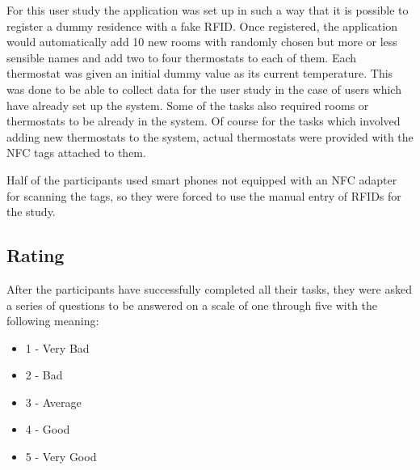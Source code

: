 For this user study the application was set up in such a way that it is possible to register a dummy residence with a fake RFID. Once registered, the application would automatically add 10 new rooms with randomly chosen but more or less sensible names and add two to four thermostats to each of them. Each thermostat was given an initial dummy value as its current temperature. This was done to be able to collect data for the user study in the case of users which have already set up the system. Some of the tasks also required rooms or thermostats to be already in the system. Of course for the tasks which involved adding new thermostats to the system, actual thermostats were provided with the NFC tags attached to them.

Half of the participants used smart phones not equipped with an NFC adapter for scanning the tags, so they were forced to use the manual entry of RFIDs for the study.

\subsection{Rating}
\label{sec:rating}
After the participants have successfully completed all their tasks, they were asked a series of questions to be answered on a scale of one through five with the following meaning:
\begin{itemize}
\item{1 - Very Bad}
\item{2 - Bad}
\item{3 - Average}
\item{4 - Good}
\item{5 - Very Good}
\end{itemize}

